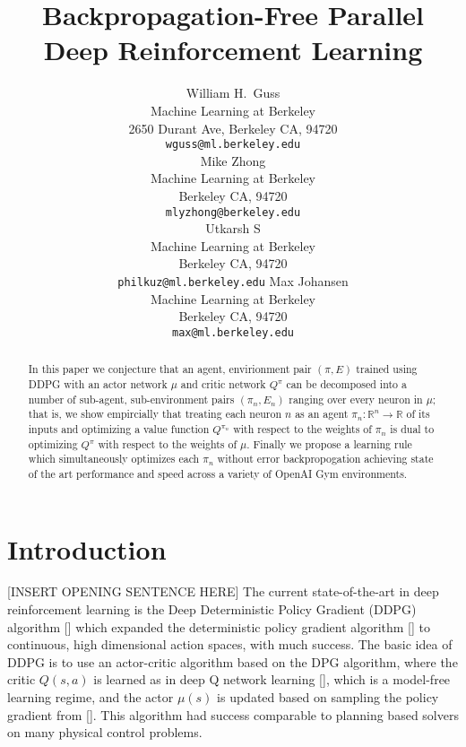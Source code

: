 \documentclass{article} %
\title{Backpropagation-Free Parallel Deep Reinforcement Learning}
\author{
William H.~Guss \\
Machine Learning at Berkeley\\
2650 Durant Ave, Berkeley CA, 94720 \\
\texttt{wguss@ml.berkeley.edu} \\
\And
Mike Zhong \\
Machine Learning at Berkeley \\
Berkeley CA, 94720 \\
\texttt{mlyzhong@berkeley.edu} \\
\And
Utkarsh S \\
Machine Learning at Berkeley \\
Berkeley CA, 94720 \\
\texttt{philkuz@ml.berkeley.edu}
\And
Max Johansen \\
Machine Learning at Berkeley \\
Berkeley CA, 94720 \\
\texttt{max@ml.berkeley.edu}
}
\numberwithin{equation}{subsection}
\numberwithin{theorem}{subsection}
\begin{document}
\maketitle

\begin{abstract}
    In this paper we conjecture that an agent, envirionment pair $(\pi, E)$ trained using DDPG with an actor network $\mu$ and critic network $Q^{\pi}$ can be decomposed into a number of sub-agent, sub-environment pairs  $(\pi_n, E_n)$ ranging over every neuron in $\mu$; that is, we show empircially that treating each neuron $n$ as an agent $\pi_n: \mathbb{R}^n \to \mathbb{R}$ of its inputs and optimizing a value function $Q^{\pi_n}$ with respect to the weights of $\pi_n$ is dual to optimizing $Q^\pi$ with respect to the weights of $\mu$. Finally we propose a learning rule which simultaneously optimizes each $\pi_n$ without error backpropogation achieving state of the art performance and speed across a variety of OpenAI Gym environments.
\end{abstract}
\listoftodos


\section{Introduction}
[INSERT OPENING SENTENCE HERE] The current state-of-the-art in deep reinforcement learning is the Deep Deterministic Policy Gradient (DDPG) algorithm [\cite{lillicrap2015ddpg}] which expanded the deterministic policy gradient algorithm [\cite{silver2014dpg}] to continuous, high dimensional action spaces, with much success. The basic idea of DDPG is to use an actor-critic algorithm based on the DPG algorithm, where the critic $Q(s, a)$ is learned as in deep Q network learning [\cite{mnih2013dqn}], which is a model-free learning regime, and the actor $\mu(s)$ is updated based on sampling the policy gradient from [\cite{silver2014dpg}]. This algorithm had success comparable to planning based solvers on many physical control problems. 



\end{document}
